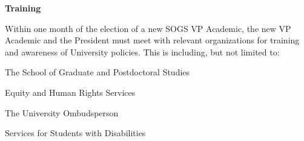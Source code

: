 \begin{longenum}
\textbf{Training}
\item Within one month of the election of a new SOGS VP Academic, the new VP Academic and the President must meet with relevant organizations for training and awareness of University policies. This is including, but not limited to:
\begin{longenum}
\item The School of Graduate and Postdoctoral Studies
\item Equity and Human Rights Services
\item The University Ombudsperson
\item Services for Students with Disabilities
\end{longenum}
\end{longenum}